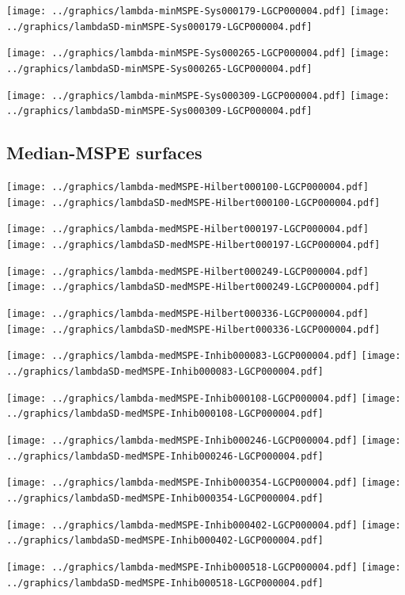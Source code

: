 \documentclass[review]{elsarticle}
\begin{document}
\texttt{[image: ../graphics/lambda-minMSPE-Sys000179-LGCP000004.pdf]}
\texttt{[image: ../graphics/lambdaSD-minMSPE-Sys000179-LGCP000004.pdf]}

\texttt{[image: ../graphics/lambda-minMSPE-Sys000265-LGCP000004.pdf]}
\texttt{[image: ../graphics/lambdaSD-minMSPE-Sys000265-LGCP000004.pdf]}

\texttt{[image: ../graphics/lambda-minMSPE-Sys000309-LGCP000004.pdf]}
\texttt{[image: ../graphics/lambdaSD-minMSPE-Sys000309-LGCP000004.pdf]}

\subsection{Median-MSPE surfaces}

\texttt{[image: ../graphics/lambda-medMSPE-Hilbert000100-LGCP000004.pdf]}
\texttt{[image: ../graphics/lambdaSD-medMSPE-Hilbert000100-LGCP000004.pdf]}

\texttt{[image: ../graphics/lambda-medMSPE-Hilbert000197-LGCP000004.pdf]}
\texttt{[image: ../graphics/lambdaSD-medMSPE-Hilbert000197-LGCP000004.pdf]}

\texttt{[image: ../graphics/lambda-medMSPE-Hilbert000249-LGCP000004.pdf]}
\texttt{[image: ../graphics/lambdaSD-medMSPE-Hilbert000249-LGCP000004.pdf]}

\texttt{[image: ../graphics/lambda-medMSPE-Hilbert000336-LGCP000004.pdf]}
\texttt{[image: ../graphics/lambdaSD-medMSPE-Hilbert000336-LGCP000004.pdf]}

\texttt{[image: ../graphics/lambda-medMSPE-Inhib000083-LGCP000004.pdf]}
\texttt{[image: ../graphics/lambdaSD-medMSPE-Inhib000083-LGCP000004.pdf]}

\texttt{[image: ../graphics/lambda-medMSPE-Inhib000108-LGCP000004.pdf]}
\texttt{[image: ../graphics/lambdaSD-medMSPE-Inhib000108-LGCP000004.pdf]}

\texttt{[image: ../graphics/lambda-medMSPE-Inhib000246-LGCP000004.pdf]}
\texttt{[image: ../graphics/lambdaSD-medMSPE-Inhib000246-LGCP000004.pdf]}

\texttt{[image: ../graphics/lambda-medMSPE-Inhib000354-LGCP000004.pdf]}
\texttt{[image: ../graphics/lambdaSD-medMSPE-Inhib000354-LGCP000004.pdf]}

\texttt{[image: ../graphics/lambda-medMSPE-Inhib000402-LGCP000004.pdf]}
\texttt{[image: ../graphics/lambdaSD-medMSPE-Inhib000402-LGCP000004.pdf]}

\texttt{[image: ../graphics/lambda-medMSPE-Inhib000518-LGCP000004.pdf]}
\texttt{[image: ../graphics/lambdaSD-medMSPE-Inhib000518-LGCP000004.pdf]}
\end{document}
